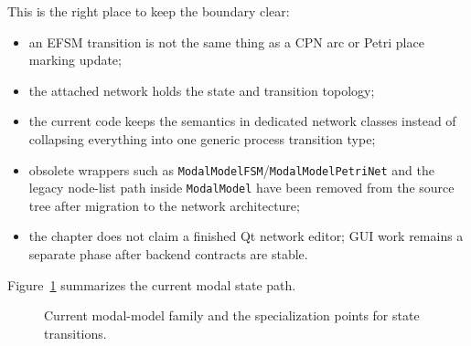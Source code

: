 This is the right place to keep the boundary clear:
\begin{itemize}
\item an EFSM transition is not the same thing as a CPN arc or Petri place
  marking update;
\item the attached network holds the state and transition topology;
\item the current code keeps the semantics in dedicated network classes instead
  of collapsing everything into one generic process transition type;
\item obsolete wrappers such as \texttt{ModalModelFSM}/\texttt{ModalModelPetriNet}
  and the legacy node-list path inside \texttt{ModalModel} have been
  removed from the source tree after migration to the network architecture;
\item the chapter does not claim a finished Qt network editor; GUI work remains
  a separate phase after backend contracts are stable.
\end{itemize}

Figure~\ref{fig:modal-state-transitions} summarizes the current modal state
path.

\begin{figure}[htbp]
\centering
\caption{Current modal-model family and the specialization points for state transitions.}
\label{fig:modal-state-transitions}
\end{figure}

